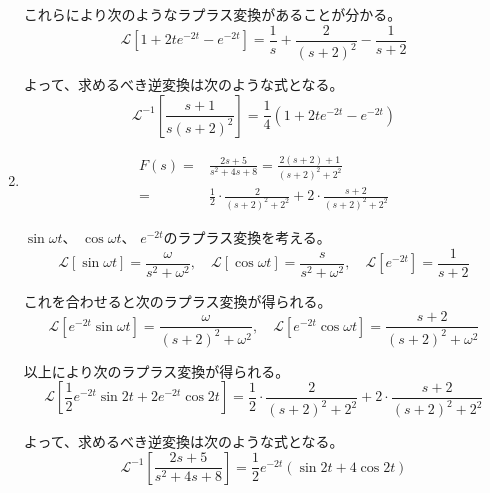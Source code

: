 \documentclass[12pt,b5paper]{ltjsarticle}
\begin{document}
\begin{enumerate}
      これらにより次のようなラプラス変換があることが分かる。
      \begin{equation}
       \mathcal{L}\left[ 1 + 2te^{-2t} - e^{-2t} \right]
        = \frac{1}{s} + \frac{2}{(s+2)^2} - \frac{1}{s+2}
      \end{equation}

      よって、求めるべき逆変換は次のような式となる。
      \begin{equation}
       \mathcal{L}^{-1}\left[ \frac{s+1}{s(s+2)^2} \right]
        = \frac{1}{4}( 1 + 2te^{-2t} - e^{-2t} )
      \end{equation}

      \dotfill

 \item

      \begin{align}
       F(s) =& \frac{2s+5}{s^2+4s+8}
         = \frac{2(s+2)+1}{(s+2)^2+2^2}\\
         =& \frac{1}{2}\cdot\frac{2}{(s+2)^2+2^2} + 2\cdot\frac{s+2}{(s+2)^2+2^2}
      \end{align}

      $\sin \omega t$、
      $\cos \omega t$、
      $e^{-2t}$のラプラス変換を考える。
      \begin{equation}
       \mathcal{L}[\sin \omega t] = \frac{\omega}{s^2+\omega^2}, \quad
       \mathcal{L}[\cos \omega t] = \frac{s}{s^2+\omega^2}, \quad
       \mathcal{L}[e^{-2t}] = \frac{1}{s+2}
      \end{equation}

      これを合わせると次のラプラス変換が得られる。
      \begin{equation}
       \mathcal{L}[e^{-2t}\sin \omega t] = \frac{\omega}{(s+2)^2+\omega^2}, \quad
       \mathcal{L}[e^{-2t}\cos \omega t] = \frac{s+2}{(s+2)^2+\omega^2}
      \end{equation}

      以上により次のラプラス変換が得られる。
      \begin{equation}
       \mathcal{L}\left[ \frac{1}{2}e^{-2t}\sin 2t + 2e^{-2t}\cos 2t \right]
                   = \frac{1}{2}\cdot\frac{2}{(s+2)^2+2^2} + 2\cdot\frac{s+2}{(s+2)^2+2^2}
      \end{equation}

      よって、求めるべき逆変換は次のような式となる。
      \begin{equation}
        \mathcal{L}^{-1}\left[ \frac{2s+5}{s^2+4s+8} \right]
         =\frac{1}{2}e^{-2t} \left( \sin 2t + 4\cos 2t \right)
      \end{equation}


\end{enumerate}
\end{document}

